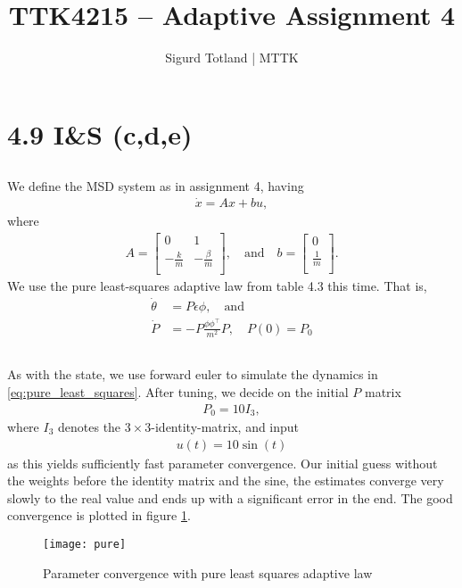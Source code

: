 \documentclass[]{article}
\title{TTK4215 – Adaptive Assignment 4}
\author{Sigurd Totland | MTTK}
\begin{document}
\maketitle

\section{4.9 I\&S (c,d,e)}
\setcounter{subsection}{2}
\subsection{}
We define the MSD system as in assignment 4, having
\begin{equation}\begin{aligned}
\dot x = Ax + bu,
\end{aligned}\end{equation}
where
\begin{equation}\begin{aligned}
A =
\begin{bmatrix}
0 & 1 \\
-\frac{k}{m} & -\frac{\beta}{m} \\
\end{bmatrix}, \quad \text{and} \quad
b =
\begin{bmatrix}
0\\
\frac{1}{m}\\
\end{bmatrix}.
\end{aligned}\end{equation}
We use the pure least-squares adaptive law from table 4.3 this time. That is,
\begin{equation}\begin{aligned}
\label{eq:pure_least_squares}
\dot \theta &= P \epsilon \phi, \quad \text{and} \\
\dot P &= -P \frac{\phi \phi^\top}{m^2}P, \quad P(0) = P_0
\end{aligned}\end{equation}
\subsection{}
As with the state, we use forward euler to simulate the dynamics in \eqref{eq:pure_least_squares}.
After tuning, we decide on the initial $P$ matrix
\begin{equation}\begin{aligned}
P_0 = 10I_3,
\end{aligned}\end{equation}
where $I_3$ denotes the $3 \times 3$-identity-matrix, and input
\begin{equation}\begin{aligned}
u(t) = 10 \sin(t)
\end{aligned}\end{equation}
as this yields sufficiently fast parameter convergence. Our initial guess without the weights before the identity matrix and the sine, the estimates converge very slowly to the real value and ends up with a significant error in the end. The good convergence is plotted in figure \ref{fig:pure}.

\begin{figure}[H]
\centering
\texttt{[image: pure]}
\caption{Parameter convergence with pure least squares adaptive law}
\label{fig:pure}
\end{figure}
\end{document}

